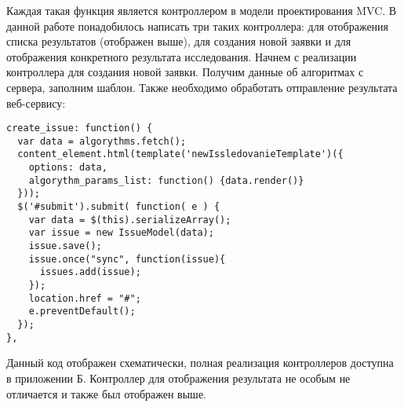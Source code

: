Каждая такая функция является контроллером в модели проектирования MVC. В данной работе понадобилось написать три таких контроллера: для отображения списка результатов (отображен выше), для создания новой заявки и для отображения конкретного результата исследования. Начнем с реализации контроллера для создания новой заявки. Получим данные об алгоритмах с сервера, заполним шаблон. Также необходимо обработать отправление результата веб-сервису:
\begin{lstlisting}
create_issue: function() {
  var data = algorythms.fetch();
  content_element.html(template('newIssledovanieTemplate')({
    options: data,
    algorythm_params_list: function() {data.render()}
  }));
  $('#submit').submit( function( e ) {
    var data = $(this).serializeArray();
    var issue = new IssueModel(data);
    issue.save();
    issue.once("sync", function(issue){
      issues.add(issue);
    });
    location.href = "#";
    e.preventDefault();
  });
},
\end{lstlisting}

Данный код отображен схематически, полная реализация контроллеров доступна в приложении Б. Контроллер для отображения результата не особым не отличается и также был отображен выше.